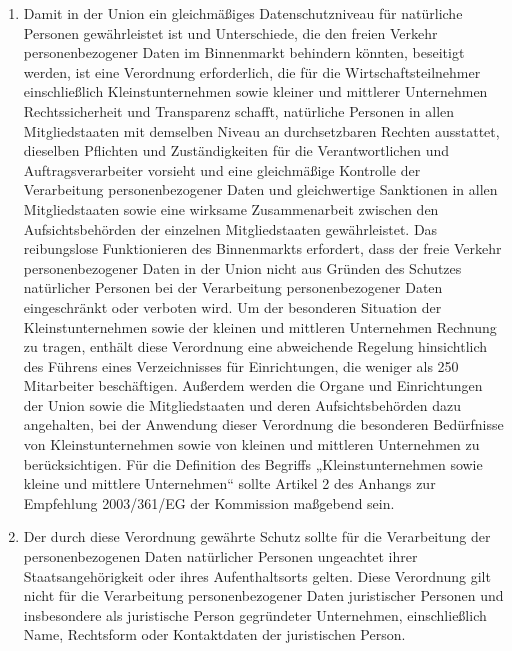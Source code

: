 \begin{enumerate}
   \item Damit in der Union ein gleichmäßiges Datenschutzniveau für natürliche Personen gewährleistet ist und
    Unterschiede, die den freien Verkehr personenbezogener Daten im Binnenmarkt behindern könnten, beseitigt werden,
    ist eine Verordnung erforderlich, die für die Wirtschaftsteilnehmer einschließlich Kleinstunternehmen sowie kleiner
    und mittlerer Unternehmen Rechtssicherheit und Transparenz schafft, natürliche Personen in allen Mitgliedstaaten
    mit demselben Niveau an durchsetzbaren Rechten ausstattet, dieselben Pflichten und Zuständigkeiten für die
    Verantwortlichen und Auftragsverarbeiter vorsieht und eine gleichmäßige Kontrolle der Verarbeitung
    personenbezogener Daten und gleichwertige Sanktionen in allen Mitgliedstaaten sowie eine wirksame Zusammenarbeit
    zwischen den Aufsichtsbehörden der einzelnen Mitgliedstaaten gewährleistet. Das reibungslose Funktionieren des
    Binnenmarkts erfordert, dass der freie Verkehr personenbezogener Daten in der Union nicht aus Gründen des Schutzes
    natürlicher Personen bei der Verarbeitung personenbezogener Daten eingeschränkt oder verboten wird. Um der
    besonderen Situation der Kleinstunternehmen sowie der kleinen und mittleren Unternehmen Rechnung zu tragen, enthält
    diese Verordnung eine abweichende Regelung hinsichtlich des Führens eines Verzeichnisses für Einrichtungen, die
    weniger als 250 Mitarbeiter beschäftigen. Außerdem werden die Organe und Einrichtungen der Union sowie die
    Mitgliedstaaten und deren Aufsichtsbehörden dazu angehalten, bei der Anwendung dieser Verordnung die besonderen
    Bedürfnisse von Kleinstunternehmen sowie von kleinen und mittleren Unternehmen zu berücksichtigen. Für die
    Definition des Begriffs „Kleinstunternehmen sowie kleine und mittlere Unternehmen“ sollte Artikel 2 des Anhangs zur
    Empfehlung 2003/361/EG der Kommission maßgebend sein.%
   \label{itm:eg-13}
   

   \item Der durch diese Verordnung gewährte Schutz sollte für die Verarbeitung der personenbezogenen Daten natürlicher
    Personen ungeachtet ihrer Staatsangehörigkeit oder ihres Aufenthaltsorts gelten. Diese Verordnung gilt nicht für
    die Verarbeitung personenbezogener Daten juristischer Personen und insbesondere als juristische Person gegründeter
    Unternehmen, einschließlich Name, Rechtsform oder Kontaktdaten der juristischen Person.%
   \label{itm:eg-14}
   

\end{enumerate}
